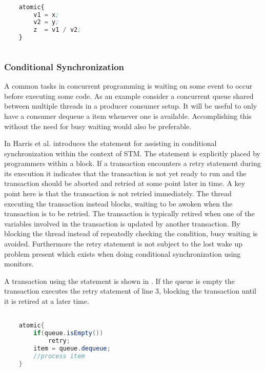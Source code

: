 \begin{lstlisting}[label=lst:stm_atomic_block,
  caption={The atomic block},
  language=Lisp,  
  showspaces=false,
  showtabs=false,
  breaklines=true,
  showstringspaces=false,
  breakatwhitespace=true,
  commentstyle=\color{greencomments},
  keywordstyle=\color{bluekeywords},
  stringstyle=\color{redstrings},
  morekeywords={atomic}]  % Start your code-block

	atomic{
		v1 = x;
		v2 = y;
		z  = v1 / v2;	
	}
       
\end{lstlisting}

\subsubsection{Conditional Synchronization}
A common tasks in concurrent programming is waiting on some event to occur before executing some code. As an example consider a concurrent queue shared between multiple threads in a producer consumer setup. It will be useful to only have a consumer dequeue a item whenever one is available. Accomplishing this without the need for busy waiting would also be preferable.

In \cite{harris2005composable} Harris et al. introduces the  statement for assisting in conditional synchronization within the context of \ac{STM}. The  statement is explicitly placed by programmers within a  block. If a transaction encounters a retry statement during its execution it indicates that the transaction is not yet ready to run and the transaction should be aborted and retried at some point later in time\cite[p. 73]{harris2010transactional}. A key point here is that the transaction is not retried immediately. The thread executing the transaction instead blocks, waiting to be awoken when the transaction is to be retried. The transaction is typically retired when one of the variables involved in the transaction is updated by another transaction\cite[p. 51]{harris2005composable}. By blocking the thread instead of repeatedly checking the condition, busy waiting is avoided. Furthermore the retry statement is not subject to the lost wake up problem present which exists when doing conditional synchronization using monitors\cite[p. 2081]{herlihy2011tm}.

A transaction using the  statement is shown in . If the queue is empty the transaction executes the retry statement of line 3, blocking the transaction until it is retired at a later time.
\begin{lstlisting}[label=lst:stm_retry,
  caption={The retry statement},
  language=Java,  
  showspaces=false,
  showtabs=false,
  breaklines=true,
  showstringspaces=false,
  breakatwhitespace=true,
  commentstyle=\color{greencomments},
  keywordstyle=\color{bluekeywords},
  stringstyle=\color{redstrings},
  morekeywords={atomic, retry}]  % Start your code-block

	atomic{
		if(queue.isEmpty())
			retry;
		item = queue.dequeue;
		//process item
	}
       
\end{lstlisting}

